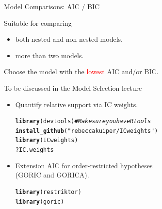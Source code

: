 \documentclass[10pt]{beamer}\usepackage[]{graphicx}\usepackage[]{xcolor}
\makeatletter
\newcommand{\hlstr}[1]{\textcolor[rgb]{0.192,0.494,0.8}{#1}}%
\newcommand{\hlcom}[1]{\textcolor[rgb]{0.678,0.584,0.686}{\textit{#1}}}%
\newcommand{\hlopt}[1]{\textcolor[rgb]{0,0,0}{#1}}%
\newcommand{\hlstd}[1]{\textcolor[rgb]{0.345,0.345,0.345}{#1}}%
\newcommand{\hlkwd}[1]{\textcolor[rgb]{0.737,0.353,0.396}{\textbf{#1}}}%
\newenvironment{kframe}{%
 \def\at@end@of@kframe{}%
 \ifinner\ifhmode%
  \def\at@end@of@kframe{\end{minipage}}%
  \begin{minipage}{\columnwidth}%
 \fi\fi%
 \def\FrameCommand##1{\hskip\@totalleftmargin \hskip-\fboxsep
 \colorbox{shadecolor}{##1}\hskip-\fboxsep
     \hskip-\linewidth \hskip-\@totalleftmargin \hskip\columnwidth}%
 \MakeFramed {\advance\hsize-\width
   \@totalleftmargin\z@ \linewidth\hsize
   \@setminipage}}%
 {\par\unskip\endMakeFramed%
 \at@end@of@kframe}
\newenvironment{knitrout}{}{} %
\makeatother
\begin{document}
\begin{frame}[fragile]{Model Comparisons: AIC / BIC}

Suitable for comparing
\begin{itemize}
  \item both nested and non-nested models.
  \item more than two models.
\end{itemize}

\vspace*{5mm}

Choose the model with the \textcolor{red}{lowest} AIC and/or BIC.

\vspace*{5mm}

To be discussed in the Model Selection lecture
\begin{itemize}
  \item Quantify relative support via IC weights.\\
\begin{knitrout}
\color{fgcolor}\begin{kframe}
\begin{alltt}
\hlkwd{library}\hlstd{(devtools)} \hlcom{# Make sure you have Rtools}
\hlkwd{install_github}\hlstd{(}\hlstr{"rebeccakuiper/ICweights"}\hlstd{)}
\hlkwd{library}\hlstd{(ICweights)}
\hlopt{?}\hlstd{IC.weights}
\end{alltt}
\end{kframe}
\end{knitrout}
  \item Extension AIC for order-restricted hypotheses \\ (GORIC and GORICA).\\
\begin{knitrout}
\color{fgcolor}\begin{kframe}
\begin{alltt}
\hlkwd{library}\hlstd{(restriktor)}
\hlkwd{library}\hlstd{(goric)}
\end{alltt}
\end{kframe}
\end{knitrout}
\end{itemize}

\end{frame}
%
\end{document}
